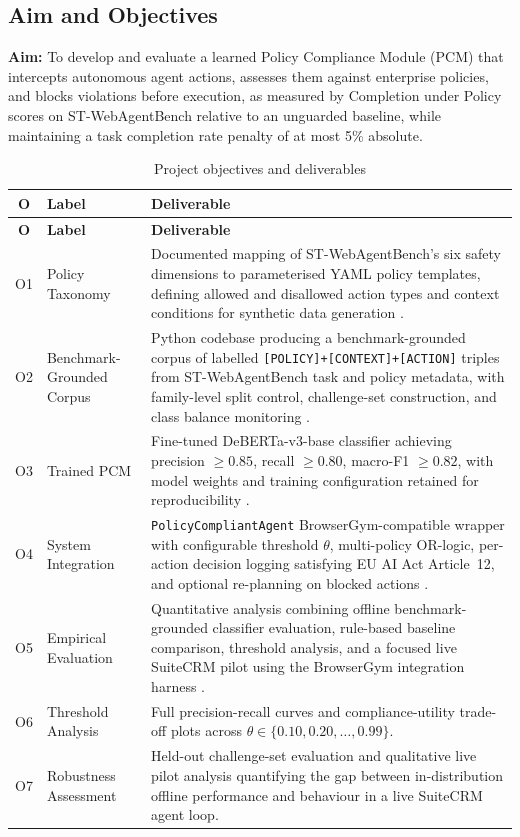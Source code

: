 \documentclass[12pt,a4paper]{article}
\begin{document}
\subsection{Aim and Objectives}
\label{sec:aims}

\textbf{Aim:} To develop and evaluate a learned Policy Compliance Module (PCM)
that intercepts autonomous agent actions, assesses them against enterprise
policies, and blocks violations before execution, as measured by Completion under
Policy scores on ST-WebAgentBench \citep{levy2026stwebagentbench} relative to an
unguarded baseline, while maintaining a task completion rate penalty of at most
5\% absolute.

\begin{longtable}[l]{@{} c l p{8.5cm} @{}}
\caption{Project objectives and deliverables}\label{tab:obj}\\
\toprule \textbf{O} & \textbf{Label} & \textbf{Deliverable} \\ \midrule
\endfirsthead
\toprule \textbf{O} & \textbf{Label} & \textbf{Deliverable} \\ \midrule
\endhead \bottomrule \endfoot
O1 & Policy Taxonomy & Documented mapping of ST-WebAgentBench's six safety
  dimensions to parameterised YAML policy templates, defining allowed and
  disallowed action types and context conditions for synthetic data generation
  \citep{levy2026stwebagentbench}. \\[3pt]
O2 & Benchmark-Grounded Corpus & Python codebase producing a benchmark-grounded
  corpus of labelled \texttt{[POLICY]+[CONTEXT]+[ACTION]} triples from
  ST-WebAgentBench task and policy metadata, with family-level split control,
  challenge-set construction, and class balance monitoring
  \citep{li2023synthetic,nadas2025synthetic}. \\[3pt]
O3 & Trained PCM & Fine-tuned DeBERTa-v3-base classifier achieving precision
  $\geq 0.85$, recall $\geq 0.80$, macro-F1 $\geq 0.82$, with model weights
  and training configuration retained for reproducibility
  \citep{he2023debertav3}. \\[3pt]
O4 & System Integration & \texttt{PolicyCompliantAgent} BrowserGym-compatible
  wrapper with configurable threshold $\theta$, multi-policy OR-logic,
  per-action decision logging satisfying EU AI Act Article~12, and optional
  re-planning on blocked actions \citep{chezelles2025browsergym}. \\[3pt]
O5 & Empirical Evaluation & Quantitative analysis combining offline
  benchmark-grounded classifier evaluation, rule-based baseline comparison,
  threshold analysis, and a focused live SuiteCRM pilot using the BrowserGym
  integration harness \citep{mcnemar1947note}. \\[3pt]
O6 & Threshold Analysis & Full precision-recall curves and compliance-utility
  trade-off plots across $\theta \in \{0.10, 0.20, \ldots, 0.99\}$. \\[3pt]
O7 & Robustness Assessment & Held-out challenge-set evaluation and qualitative
  live pilot analysis quantifying the gap between in-distribution offline
  performance and behaviour in a live SuiteCRM agent loop. \\
\end{longtable}
\end{document}
